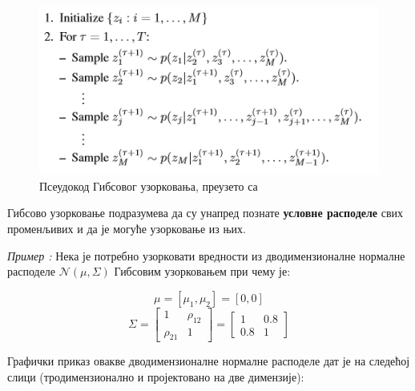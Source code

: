 \begin{figure}[H]
    \centering
\captionsetup{justification=centering}
   \includegraphics[scale=0.8]{./Slike/slika21.png} 
	\caption{Псеудокод Гибсовог узорковања, преузето са \cite{verov7}} 
	\label{fig:slika20}
\end{figure}


Гибсово узорковање подразумева да су унапред познате  \textbf{условне расподеле} свих променљивих и да је могуће узорковање из њих.

\textit{Пример :} Нека је потребно узорковати вредности из дводимензионалне нормалне расподеле $ \mathcal{N}(\mu, \Sigma )$ Гибсовим узорковањем при чему је:

$$\mu = [\mu_1,\mu_2] = [0,0]$$
$$\Sigma = \left[
\begin{array}{cc}
1 & \rho_{12} \\
\rho_{21} & 1
\end{array}
\right] =  \left[
\begin{array}{cc}
1 & 0.8 \\
0.8 & 1
\end{array}
\right]$$

Графички приказ овакве дводимензионалне нормалне расподеле дат је на следећој слици 
(тродимензионално и пројектовано на две димензије):

